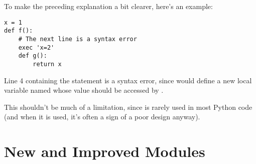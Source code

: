 \documentclass{howto}
\begin{document}
To make the preceding explanation a bit clearer, here's an example:

\begin{verbatim}
x = 1
def f():
    # The next line is a syntax error
    exec 'x=2'  
    def g():
        return x
\end{verbatim}

Line 4 containing the  statement is a syntax error,
since  would define a new local variable named 
whose value should be accessed by .  

This shouldn't be much of a limitation, since  is rarely
used in most Python code (and when it is used, it's often a sign of a
poor design anyway).

\begin{seealso}


\end{seealso}


\section{New and Improved Modules}
\end{document}

